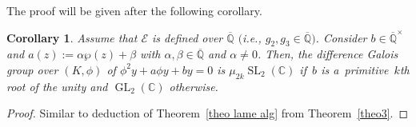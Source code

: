 \documentclass[pdftex]{sigma}
\numberwithin{equation}{section}
\newtheorem{Corollary}[Theorem]{Corollary}
\begin{document}
The proof will be given after the following corollary.

\begin{Corollary}
Assume that $\mathcal{E}$ is defined over $\overline{\mathbb{Q}}$ $($i.e., $g_{2},g_{3} \in \overline{\mathbb{Q}})$.
Consider $b\in \overline{\mathbb{Q}}^{\times}$ and $a(z):=\alpha \wp(z) + \beta$ with $\alpha,\beta \in
\overline{\mathbb{Q}}$ and $\alpha \neq 0$.
Then, the difference Galois group over $(K,\phi)$ of $\phi^2 y +a\phi y+by=0$ is $\mu_{2k} \operatorname{SL}_{2}(\mathbb
C)$ if~$b$ is a~primitive~$k$th root of the unity and $\operatorname{GL}_{2}(\mathbb C)$ otherwise.
\end{Corollary}

\begin{proof}
Similar to deduction of Theorem~\ref{theo lame alg} from Theorem~\ref{theo3}.
\end{proof}
\end{document}

